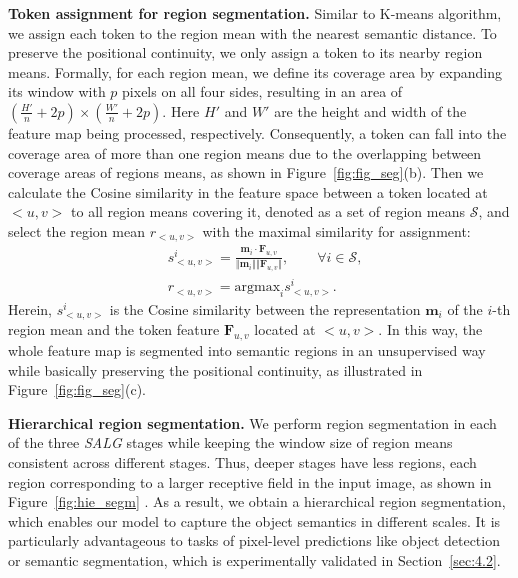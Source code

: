 \smallskip\noindent\textbf{Token assignment for region segmentation.} Similar to K-means algorithm, we assign each token to the region mean with the nearest semantic distance. To preserve the positional continuity, we only assign a token to its nearby region means. Formally, for each region mean, we define its coverage area by expanding its window with $p$ pixels on all four sides, resulting in an area of $(\frac{H'}{n}+2p) \times (\frac{W'}{n}+2p)$. Here $H'$ and $W'$ are the height and width of the feature map being processed, respectively. Consequently, a token can fall into the coverage area of more than one region means due to the overlapping between coverage areas of regions means, as shown in Figure~\ref{fig:fig_seg}(b). Then we calculate the Cosine similarity in the feature space between a token located at $<u,v>$ to all region means covering it, denoted as a set of region means $\mathcal{S}$, and select the region mean $r_{<u,v>}$ with the maximal similarity for assignment:
\begin{equation}
\begin{split}
& s_{<u,v>}^i = \frac{\mathbf{m}_i \cdot \mathbf{F}_{u,v}}{ \Vert \mathbf{m}_i \Vert \Vert \mathbf{F}_{u,v} \Vert}, \qquad \forall i \in \mathcal{S},\\
& r_{<u,v>} = \text{argmax}_{i}{s_{<u,v>}^i}.
\end{split}
\label{eqn:token_assign}
\end{equation}
Herein, $s_{<u,v>}^i$ is the Cosine similarity between the representation $\mathbf{m}_i$ of the $i$-th region mean and the token feature $\mathbf{F}_{u,v}$ located at $<u,v>$. In this way, the whole feature map is segmented into semantic regions in an unsupervised way while basically preserving the positional continuity, as illustrated in Figure~\ref{fig:fig_seg}(c). 

\smallskip\noindent\textbf{Hierarchical region segmentation.} We perform region segmentation in each of the  three \emph{SALG} stages while keeping the window size of region means consistent across different stages. Thus, deeper stages have less regions, each region corresponding to a larger receptive field in the input image, as shown in Figure~\ref{fig:hie_segm} . As a result, we obtain a hierarchical region segmentation, which enables our model to capture the object semantics in  different scales. It is particularly advantageous to tasks of pixel-level predictions like object detection or semantic segmentation, which is experimentally validated in Section~\ref{sec:4.2}.

